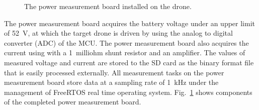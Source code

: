\documentclass[journal]{./template/IEEEtran}
\begin{document}
\begin{figure}[ht]
\caption{The power measurement board installed on the drone.}
\label{fig:board}
\end{figure}

The power measurement board acquires the battery voltage under an upper limit of 52~V, at which the target drone is driven by using the analog to digital converter (ADC) of the MCU. 
The power measurement board also acquires the current using with a 1~milliohm shunt resistor and an amplifier.
The values of measured voltage and current are stored to the SD card as the binary format file that is easily processed externally.
All measurement tasks on the power measurement board store data at a sampling rate of 1~kHz under the management of FreeRTOS real time operating system.
Fig.~\ref{fig:board} shows components of the completed power measurement board.
\end{document}
